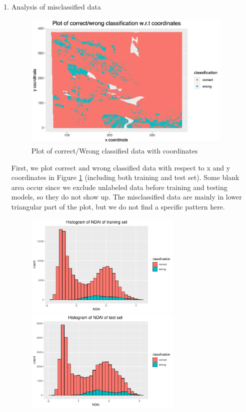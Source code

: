 \documentclass[11pt]{article}
\begin{document}
\begin{enumerate}[label=(\alph*)]
\item Analysis of misclassified data \\
	\begin{figure}[h!]
		\centering
		\includegraphics[width = 10cm]{Figure/coor}
		\caption{Plot of correct/Wrong classified data with coordinates}
		\label{coor}
	\end{figure}
	First, we plot correct and wrong classified data with respect to x and y coordinates in Figure \ref{coor} (including both training and test set). Some blank area occur since we exclude unlabeled data before training and testing models, so they do not show up. The misclassified data are mainly in lower triangular part of the plot, but we do not find a specific pattern here.\\
	\begin{figure}[h!]
		\centering
		\includegraphics[width = 7.5cm]{Figure/hist1}
		\includegraphics[width = 7.5cm]{Figure/hist2}

\end{figure}
\end{enumerate}
\end{document}

